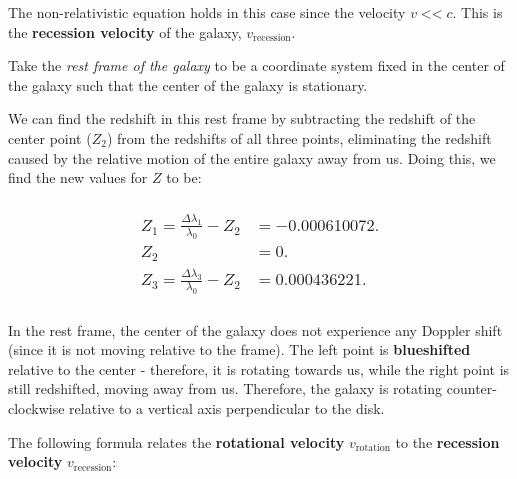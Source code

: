 \documentclass[
]{article}
\begin{document}
The non-relativistic equation holds in this case since the velocity
{\(v\operatorname{<<}c\)}. This is the \textbf{recession velocity} of
the galaxy, {\(v_{\text{recession}}\)}.

Take the \emph{rest frame of the galaxy} to be a coordinate system fixed
in the center of the galaxy such that the center of the galaxy is
stationary.

We can find the redshift in this rest frame by subtracting the redshift
of the center point ({\(Z_{2}\)}) from the redshifts of all three
points, eliminating the redshift caused by the relative motion of the
entire galaxy away from us. Doing this, we find the new values for
{\(Z\)} to be:

\hypertarget{beginmatrix-z_1-fracdeltalambda_1lambda_0---z_2---0.000610072.-z_2-0.-z_3-fracdeltalambda_3lambda_0---z_2-0.000436221.-endmatrix}{%
\subsubsection{\texorpdfstring{{\[\begin{matrix}
{Z_{1} = \frac{\Delta\lambda_{1}}{\lambda_{0}} - Z_{2}} & {= - 0.000610072.} \\
Z_{2} & {= 0.} \\
{Z_{3} = \frac{\Delta\lambda_{3}}{\lambda_{0}} - Z_{2}} & {= 0.000436221.} \\
\end{matrix}\]}}{\textbackslash begin\{matrix\}
\{Z\_\{1\} = \textbackslash frac\{\textbackslash Delta\textbackslash lambda\_\{1\}\}\{\textbackslash lambda\_\{0\}\} - Z\_\{2\}\} \& \{= - 0.000610072.\} \textbackslash\textbackslash{}
Z\_\{2\} \& \{= 0.\} \textbackslash\textbackslash{}
\{Z\_\{3\} = \textbackslash frac\{\textbackslash Delta\textbackslash lambda\_\{3\}\}\{\textbackslash lambda\_\{0\}\} - Z\_\{2\}\} \& \{= 0.000436221.\} \textbackslash\textbackslash{}
\textbackslash end\{matrix\}}}\label{beginmatrix-z_1-fracdeltalambda_1lambda_0---z_2---0.000610072.-z_2-0.-z_3-fracdeltalambda_3lambda_0---z_2-0.000436221.-endmatrix}}

In the rest frame, the center of the galaxy does not experience any
Doppler shift (since it is not moving relative to the frame). The left
point is \textbf{blueshifted} relative to the center - therefore, it is
rotating towards us, while the right point is still redshifted, moving
away from us. Therefore, the galaxy is rotating counter-clockwise
relative to a vertical axis perpendicular to the disk.

The following formula relates the \textbf{rotational velocity}
{\(v_{\text{rotation}}\)} to the \textbf{recession velocity}
{\(v_{\text{recession}}\)}:
\end{document}
